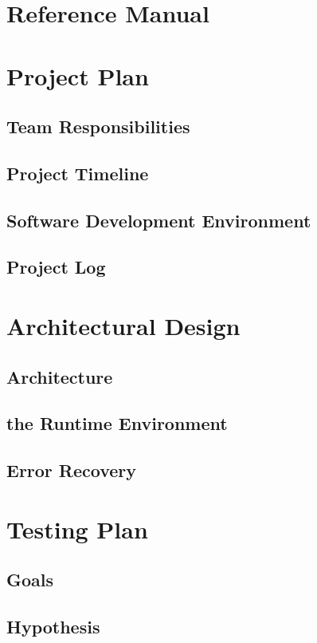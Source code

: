 \documentclass[letterpaper,12pt]{article}
\begin{document}
\section{Reference Manual}


\section{Project Plan}
    \subsection{Team Responsibilities}
    \subsection{Project Timeline}
    \subsection{Software Development Environment}
    \subsection{Project Log}
    
\section{Architectural Design}
    \subsection{Architecture}
    \subsection{the Runtime Environment}
    \subsection{Error Recovery}

\section{Testing Plan}
    \subsection{Goals}
    \subsection{Hypothesis}
\end{document}
